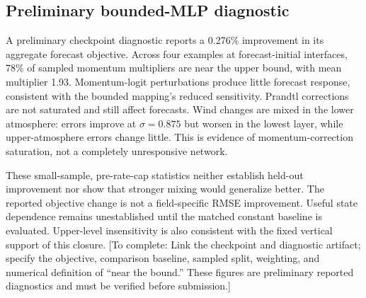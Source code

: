 \documentclass{article}
\newcommand{\pending}[1]{\textcolor{blue!65!black}{[To complete: #1]}}
\begin{document}
\subsection{Preliminary bounded-MLP diagnostic}
A preliminary checkpoint diagnostic reports a 0.276\% improvement in its
aggregate forecast objective. Across four examples at forecast-initial
interfaces, 78\% of sampled momentum multipliers are near the upper bound,
with mean multiplier 1.93. Momentum-logit perturbations produce little
forecast response, consistent with the bounded mapping's reduced sensitivity.
Prandtl corrections are not saturated and still affect forecasts. Wind
changes are mixed in the lower atmosphere: errors improve at
\(\sigma=0.875\) but worsen in the lowest layer, while upper-atmosphere
errors change little. This is evidence of momentum-correction saturation,
not a completely unresponsive network.

These small-sample, pre-rate-cap statistics neither establish held-out
improvement nor show that stronger mixing would generalize better. The
reported objective change is not a field-specific RMSE improvement. Useful
state dependence remains unestablished until the matched constant baseline
is evaluated. Upper-level insensitivity is also consistent with the fixed
vertical support of this closure.
\pending{Link the checkpoint and diagnostic artifact; specify the objective,
comparison baseline, sampled split, weighting, and numerical definition of
``near the bound.'' These figures are preliminary reported diagnostics and
must be verified before submission.}
\end{document}
